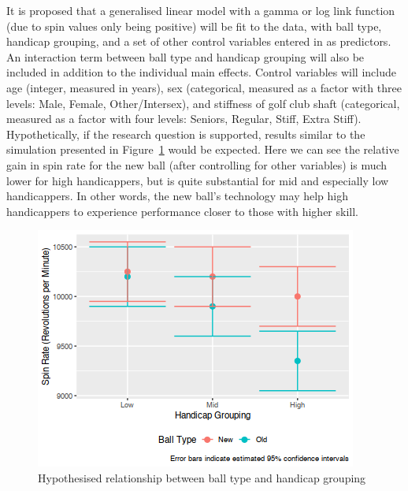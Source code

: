 \documentclass{article}
\begin{document}
It is proposed that a generalised linear model with a gamma or log link function (due to spin values only being positive) will be fit to the data, with ball type, handicap grouping, and a set of other control variables entered in as predictors. 
An interaction term between ball type and handicap grouping will also be included in addition to the individual main effects. 
Control variables will include age (integer, measured in years), sex (categorical, measured as a factor with three levels: Male, Female, Other/Intersex), and stiffness of golf club shaft (categorical, measured as a factor with four levels: Seniors, Regular, Stiff, Extra Stiff). 
Hypothetically, if the research question is supported, results similar to the simulation presented in Figure~\ref{fig:expectations} would be expected.
Here we can see the relative gain in spin rate for the new ball (after controlling for other variables) is much lower for high handicappers, but is quite substantial for mid and especially low handicappers. 
In other words, the new ball's technology may help high handicappers to experience performance closer to those with higher skill.

\begin{figure}[h]
    \centering
    \includegraphics[max width=\linewidth, scale=0.53]{expectations}
    \caption{\label{fig:expectations}Hypothesised relationship between ball type and handicap grouping}
\end{figure}
\end{document}
